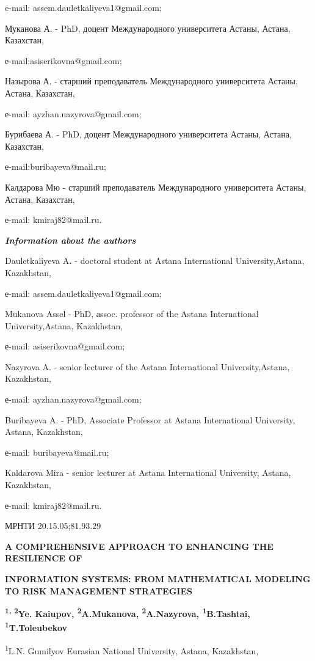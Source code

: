 e-mail: assem.dauletkaliyeva1@gmail.com;

Муканова А. - PhD, доцент Международного университета Астаны, Астана,
Казахстан,

е-mail:asiserikovna@gmail.com;

Назырова А. - старший преподаватель Международного университета Астаны,
Астана, Казахстан,

е-mail: ayzhan.nazyrova@gmail.com;

Бурибаева А. - PhD, доцент Международного университета Астаны, Астана,
Казахстан,

е-mail:buribayeva@mail.ru;

Калдарова Мю - старший преподаватель Международного университета Астаны,
Астана, Казахстан,

е-mail: kmiraj82@mail.ru.

\emph{\textbf{Information about the authors}}

Dauletkaliyeva A\textbf{.} - doctoral student at Astana International
University,Astana, Kazakhstan,

е-mail: assem.dauletkaliyeva1@gmail.com;

Mukanova Assel - PhD, аssoc. professor of the Astana International
University,Astana, Kazakhstan,

е-mail: asiserikovna@gmail.com;

Nazyrova A. - senior lecturer of the Astana International
University,Astana, Kazakhstan,

е-mail: ayzhan.nazyrova@gmail.com;

Buribayeva A. - PhD, Associate Professor at Astana International
University, Astana, Kazakhstan,

е-mail: buribayeva@mail.ru;

Kaldarova Mira - senior lecturer at Astana International University,
Astana, Kazakhstan,

е-mail: kmiraj82@mail.ru.

МРНТИ 20.15.05;81.93.29

\textbf{A COMPREHENSIVE APPROACH TO ENHANCING THE RESILIENCE OF}

\textbf{INFORMATION SYSTEMS: FROM MATHEMATICAL MODELING TO RISK
MANAGEMENT STRATEGIES}

\textbf{\textsuperscript{1, 2}Ye. Kaiupov,
\textsuperscript{2}A.Mukanova, \textsuperscript{2}A.Nazyrova,
\textsuperscript{1}B.Tashtai, \textsuperscript{1}T.Toleubekov}

\textsuperscript{1}L.N. Gumilyov Eurasian National University, Astana,
Kazakhstan,

